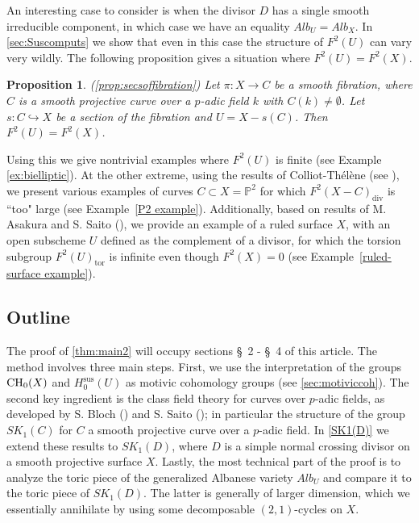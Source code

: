 \documentclass[12pt]{amsart}
\newtheorem{prop}[prop]{Proposition}
\theoremstyle{remark}
\renewcommand{\1}{{\mathbb{S}}}
\newcommand{\CH}{{\rm CH}}
\newcommand{\<}{\langle}
\renewcommand{\>}{\rangle}
\newcommand{\Sus}{{\operatorname{sus}}}
\begin{document}
An interesting case to consider is when the divisor $D$ has a single smooth irreducible component, in which case we have an equality $Alb_U=Alb_X$. In \autoref{sec:Suscomputs} we show that even  in this case the structure of $F^2(U)$ can vary very wildly.  The following proposition gives a situation where $F^2(U)=F^2(X)$. 



\begin{prop} (\autoref{prop:secsoffibration}) Let  $\pi:X\to C$ be a smooth fibration, where $C$ is a smooth projective curve over a $p$-adic field $k$ with $C(k)\neq\emptyset$. Let $s:C\hookrightarrow X$ be a section of the fibration and  $U=X-s(C)$.  Then $F^2(U)=F^2(X)$. 
\end{prop}

 Using this we give nontrivial examples where $F^2(U)$ is finite (see Example \ref{ex:bielliptic}). 
At the other extreme, using the results of Colliot-Thélène (see \cite[Appendice B]{Sz}), we present various examples of curves \( C \subset X = \mathbb{P}^2 \) for which \( F^2(X - C)_{\mathrm{div}} \) is ``too" large (see Example~\ref{P2 example}). Additionally, based on results of M. Asakura and S. Saito (\cite{AS}), we provide an example of a ruled surface \( X \), with an open subscheme \( U \) defined as the complement of a divisor, for which the torsion subgroup \( F^2(U)_{\mathrm{tor}} \) is infinite even though \( F^2(X) = 0 \) (see Example~\ref{ruled-surface example}). 










\subsection*{Outline}
 The proof of
\autoref{thm:main2} will occupy sections \S~2 - \S~4 %
of this article. The method  involves three main steps. First, we use the interpretation of the groups $\CH_0(X)$ and $H_0^{\Sus}(U)$ as motivic cohomology groups (see \autoref{sec:motiviccoh}). The second key ingredient is the class field theory for curves over $p$-adic fields, as developed by S. Bloch (\cite{Bl1}) and S. Saito (\cite{Sai}); in particular the structure of the group $SK_1(C)$ for $C$ a smooth projective curve over a $p$-adic field. In \autoref{SK1(D)} we extend these results to $SK_1(D)$, where $D$ is a simple normal crossing divisor on a smooth projective surface $X$. Lastly, the most technical part of the proof is to analyze the toric piece of the generalized Albanese variety $Alb_U$ and compare it to the toric piece of $SK_1(D)$. The latter is generally of larger dimension, which we essentially annihilate by using some decomposable $(2,1)$-cycles on $X$. 
\end{document}
